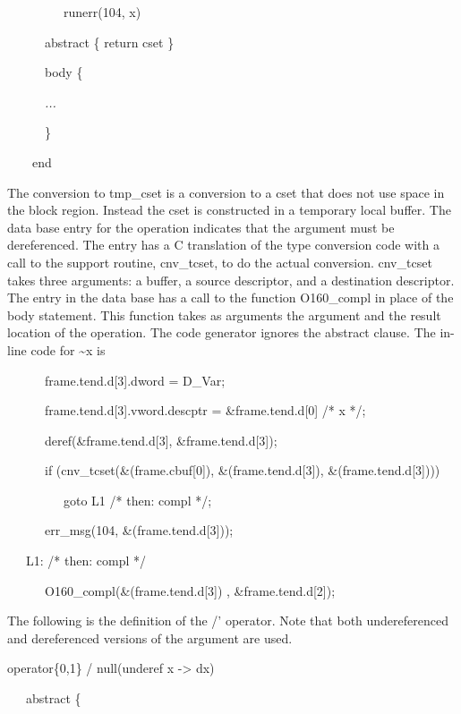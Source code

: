 {\ttfamily\mdseries
\ \ \ \ \ \ \ \ \ runerr(104, x)}

{\ttfamily\mdseries
\ \ \ \ \ \ abstract \{ return cset \}}

{\ttfamily\mdseries
\ \ \ \ \ \ body \{}

{\ttfamily\mdseries
\ \ \ \ \ \ \textit{...}}

{\ttfamily\mdseries
\ \ \ \ \ \ \}}

{\ttfamily\mdseries
\ \ \ \ end}

The conversion to tmp\_cset is a conversion to a cset that does not
use space in the block region. Instead the cset is constructed in a
temporary local buffer. The data base entry for the operation
indicates that the argument must be dereferenced. The entry has a C
translation of the type conversion code with a call to the support
routine, cnv\_tcset, to do the actual conversion. cnv\_tcset takes
three arguments: a buffer, a source descriptor, and a destination
descriptor. The entry in the data base has a call to the function
O160\_compl in place of the body statement. This function takes as
arguments the argument and the result location of the operation. The
code generator ignores the abstract clause. The in-line code for \~{}x
is

{\ttfamily\mdseries
\ \ \ \ \ \ frame.tend.d[3].dword = D\_Var;}

{\ttfamily\mdseries
\ \ \ \ \ \ frame.tend.d[3].vword.descptr = \&frame.tend.d[0] /* x */;}

{\ttfamily\mdseries
\ \ \ \ \ \ deref(\&frame.tend.d[3], \&frame.tend.d[3]);}

{\ttfamily\mdseries
\ \ \ \ \ \ if (cnv\_tcset(\&(frame.cbuf[0]), \&(frame.tend.d[3]), \&(frame.tend.d[3])))}

{\ttfamily\mdseries
\ \ \ \ \ \ \ \ \ goto L1 /* then: compl */;}

{\ttfamily\mdseries
\ \ \ \ \ \ err\_msg(104, \&(frame.tend.d[3]));}

{\ttfamily\mdseries
\ \ \ L1: /* then: compl */}

{\ttfamily\mdseries
\ \ \ \ \ \ O160\_compl(\&(frame.tend.d[3]) , \&frame.tend.d[2]);}


The following is the definition of the {\textasciigrave}/'
operator. Note that both undereferenced and dereferenced versions of
the argument are used.

{\ttfamily\mdseries
operator\{0,1\} / null(underef x -{\textgreater} dx)}

{\ttfamily\mdseries
\ \ \ abstract \{}

